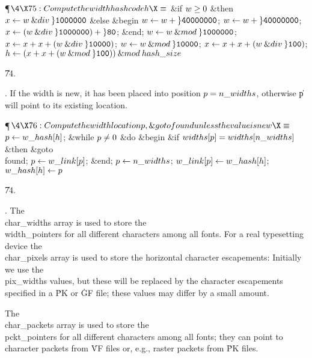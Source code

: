 \Y\P$\4\X75:Compute the width hash code \|h\X\S$\6
\&{if} $\|w\G0$ \1\&{then}\5
$\|x\K\|w\mathbin{\&{div}}\H{1000000}$\6
\4\&{else} \&{begin} $\|w\K\|w+\H{40000000}$;\5
$\|w\K\|w+\H{40000000}$;\5
$\|x\K(\|w\mathbin{\&{div}}\H{1000000})+\H{80}$;\6
\&{end};\2\6
$\|w\K\|w\mathbin{\&{mod}}\H{1000000}$;\5
$\|x\K\|x+\|x+(\|w\mathbin{\&{div}}\H{10000})$;\5
$\|w\K\|w\mathbin{\&{mod}}\H{10000}$;\5
$\|x\K\|x+\|x+(\|w\mathbin{\&{div}}\H{100})$;\5
$\|h\K(\|x+\|x+(\|w\mathbin{\&{mod}}\H{100}))\mathbin{\&{mod}}\\{hash\_size}$%
\par
\U74.\fi

. If the width is new, it has been placed into position $\|p=\\{n%
\_widths}$,
otherwise \|p will point to its existing location.

\Y\P$\4\X76:Compute the width location \|p, \&{goto}  found unless the value is
new\X\S$\6
$\|p\K\\{w\_hash}[\|h]$;\6
\&{while} $\|p\I0$ \1\&{do}\6
\&{begin} \&{if} $\\{widths}[\|p]=\\{widths}[\\{n\_widths}]$ \1\&{then}\5
\&{goto} \\{found};\2\6
$\|p\K\\{w\_link}[\|p]$;\6
\&{end};\2\6
$\|p\K\\{n\_widths}$;\6
$\\{w\_link}[\|p]\K\\{w\_hash}[\|h]$;\5
$\\{w\_hash}[\|h]\K\|p$\par
\U74.\fi

. The \\{char\_widths} array is used to store the \\{width\_pointer}s for
all
different characters among all fonts. For a real typesetting device the
\\{char\_pixels} array is used to store the horizontal character escapements:
Initially we use the \\{pix\_widths} values, but these will be replaced by
the character escapements specified in a \.{PK} or \.{GF} file;
these values may differ by a small amount.

The \\{char\_packets} array is used to store the \\{pckt\_pointer}s for all
different characters among all fonts; they can point to character
packets from \.{VF} files or, e.g., raster packets from \.{PK} files.

